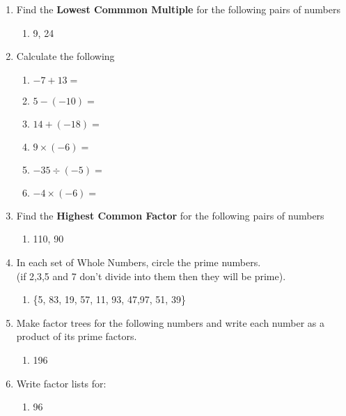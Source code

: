 \documentclass[a4paper,12pt]{article}
\begin{document}
\begin{enumerate}
		\item Find the \textbf{Lowest Commmon Multiple} for the following pairs of numbers
	\begin{multicols}{5}
		\begin{enumerate}
			\item 9, 24
		\end{enumerate}
	\end{multicols}

		\item Calculate the following
	\begin{multicols}{3}
		\begin{enumerate}
			\item $\displaystyle -7+13= $
			\item $\displaystyle 5-(-10)= $
			\item $\displaystyle 14+(-18)=$
			\item $\displaystyle 9\times (-6)=$
			\item $\displaystyle -35\div (-5)=$
			\item $\displaystyle -4\times (-6)=$
		\end{enumerate}
	\end{multicols}
	\item Find the \textbf{Highest Common Factor} for the following pairs of numbers
\begin{multicols}{5}
	\begin{enumerate}
		\item 110, 90
	\end{enumerate}
\end{multicols}
	\item In each set of Whole Numbers, circle the prime numbers.\\
	(if 2,3,5 and 7 don't divide into them then they will be prime).
	\begin{enumerate}
		\item \{5, 83, 19, 57, 11, 93, 47,97, 51, 39\}
	\end{enumerate} 
	\item Make factor trees for the following numbers and write each number as a product of its prime factors.
	\begin{multicols}{4}
		\begin{enumerate}
			\item 196
		\end{enumerate}
	\end{multicols}
\item Write factor lists for:
	\begin{multicols}{4}
		\begin{enumerate}
			\item 96
		\end{enumerate} 
	\end{multicols}


\end{enumerate}
\end{document}
